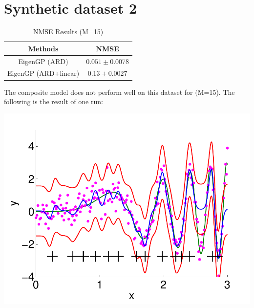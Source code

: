 \documentclass[]{article}
\begin{document}
\section{Synthetic dataset 2}
\begin{table}[h]
\caption{NMSE Results (M=15)} \label{table:basisfunction}
\vspace{-.0in}
\begin{center}
\begin{tabular}{|c|c|}
\hline
Methods & NMSE \\
\hline 
\hline
EigenGP (ARD) &  $ 0.051 \pm 0.0078$\\
\hline
EigenGP (ARD+linear)& $0.13\pm0.0027$ \\
\hline 
\end{tabular}
\end{center}
\vspace{-.0in}
\end{table}

The composite model does not perform well on this dataset for (M=15). The following is the result of one run:

\includegraphics[scale=0.8]{../syn2/fig/syn_EigenGP_kerB_ns_8.pdf}
\end{document}
